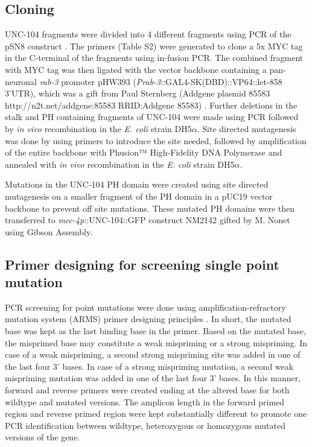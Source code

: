 \subsection{Cloning}

UNC-104 fragments were divided into 4 different fragments using PCR of the pSN8 construct \parencite{niwa2016}. The primers (Table S2) were generated to clone a 5x MYC tag in the C-terminal of the fragments using in-fusion PCR. The combined fragment with MYC tag was then ligated with the vector backbone containing a pan-neuronal \textit{rab-3} promoter pHW393 (\textit{Prab-3}::GAL4-SK(DBD)::VP64::let-858 3'UTR), which was a gift from Paul Sternberg (Addgene plasmid 85583 http://n2t.net/addgene:85583 RRID:Addgene 85583) \parencite{wang2017}. Further deletions in the stalk and PH containing fragments of UNC-104 were made using PCR followed by \textit{in vivo} recombination in the \textit{E. coli} strain DH5$\alpha$. Site directed mutagenesis was done by using primers to introduce the site needed, followed by amplification of the entire backbone with Phusion™ High-Fidelity DNA Polymerase and annealed with \textit{in vivo} recombination in the \textit{E. coli} strain DH5$\alpha$.

Mutations in the UNC-104 PH domain were created using site directed mutagenesis on a smaller fragment of the PH domain in a pUC19 vector backbone to prevent off site mutations. These mutated PH domains were then transferred to \textit{mec-4p}::UNC-104::GFP construct NM2142 gifted by M. Nonet using Gibson Assembly.


\subsection{Primer designing for screening single point mutation}

PCR screening for point mutations were done using amplification-refractory mutation system (ARMS) primer designing principles \parencite{sullenberger2018}. In short, the mutated base was kept as the last binding base in the primer. Based on the mutated base, the misprimed base may constitute a weak mispriming or a strong mispriming. In case of a weak mispriming, a second strong mispriming site was added in one of the last four 3’ bases. In case of a strong mispriming mutation, a second weak mispriming mutation was added in one of the last four 3’ bases. In this manner, forward and reverse primers were created ending at the altered base for both wildtype and mutated versions. The amplicon length in the forward primed region and reverse primed region were kept substantially different to promote one PCR identification between wildtype, heterozygous or homozygous mutated versions of the gene.

